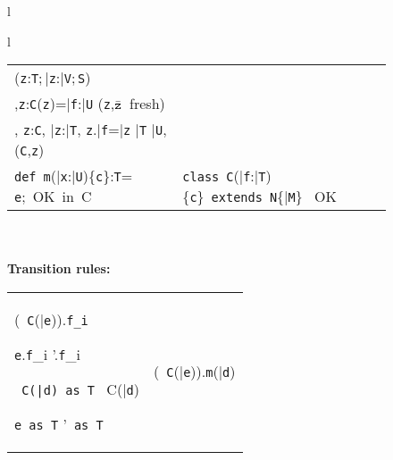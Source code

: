 \begin{figure*}
\begin{tabular}{l}
{\begin{tabular}{l}
\begin{tabular}{p{}p{}}
{                ({\tt z}:{\tt T};\,\bar{\tt z}:\bar{\tt V};\,{\tt S})}
	&
\infrule[T-New]
	{\Gamma \vdash \bar{\tt e}:\bar{\tt T} \andalso \vdash \klass({\tt C}) \\ 
	  \Gamma,{\tt z}:{\tt C}\vdash \fields({\tt z})=\bar{\tt f}:\bar{\tt U}  \andalso \mbox{({\tt z},$\bar{\tt z}$\ fresh)}\\
	  \Gamma, {\tt z}:{\tt C}, \bar{\tt z}:\bar{\tt T}, {\tt z}.\bar{\tt f}=\bar{\tt z} 
	  \vdash \bar{\tt T} \subtype \bar{\tt U}, \inv({\tt C},{\tt z})}
	{\Gamma \vdash \new\ {\tt C}(\bar{\tt e}): {\tt C}\{\bar{\tt z}:\bar{\tt T};\,\new\ {\tt C}(\bar{\tt z})=\self, \inv({\tt C},\self)\}}
\\[-12pt]
\infrule[Method OK]
	{\this:{\tt C}\vdash {\tt c}:o \andalso \this:{\tt C},\bar{\tt x}:\bar{\tt U},{\tt c} \vdash {\tt T} \ \type, \bar{\tt U} \ \type, 
	  {\tt e}:{\tt S}, {\tt S} \subtype {\tt T}}
	{{\tt def}\ {\tt m}(\bar{\tt x}:\bar{\tt U})\{{\tt c}\}:{\tt T}= {\tt e};\ \mbox{OK in}\ C}
	&
\infrule[Class OK]
	{\bar{\tt M}\ \mbox{OK in}\ {\tt C}
        \andalso
        \this:{\tt C} \vdash {\tt c}:{\tt o}
        \andalso
        \this:{\tt C},{\tt c} \vdash \bar{\tt T}\ \type, {\tt N}\ \type}
	{\mbox{\tt class}\ {\tt C}(\bar{\tt f}:\bar{\tt T})\{{\tt c}\}\ 
	  \mbox{\tt extends}\ {\tt N}\{\bar{\tt M}\} \ \mbox{OK}}
\end{tabular}
\end{tabular}}\\[-12pt]
\quad\\
{\bf Transition rules:}\\[-12pt]
{\tabcolsep=0pt
\begin{tabular}{p{}@{\quad}p{}}
\typicallabel{RC-Field}
\infrule[\RField]
	{\tt x:C \vdash \fields(\tt x)=\bar{\tt f}:\bar{\tt T}}
	{(\new\ {\tt C}(\bar{\tt e})).{\tt f_i} \derives {\tt e_i}}

\infrule[\RCField]%
	{{\tt e} \derives {{\tt e}}'}
	{{\tt e}.{\tt f}_i \derives {{\tt e}}'.{\tt f}_i}

\infrule[\RCast]%
	{\vdash {\tt C}\{\self==\new\ {\tt C}(\bar{\tt d})\} \subtype {\tt T}}
	{{\tt \new\ C(\bar{\tt d})~as~T} \derives \new\ C(\bar{\tt d})}

\infrule[\RCCast]%
	{{\tt e} \derives {{\tt e}}'}
	{{\tt e~as~T} \derives {\tt e}'~{\tt as~T}}
	&
	\typicallabel{RC-Invk-Recv}
	\infrule[\RInvk]
		{{\tt x:C}\vdash {\tt x}\ \has\ {\tt m}(\bar{\tt x}:\bar{\tt T}){\tt \{c\}:T=e}}
		{(\new\ {\tt C}(\bar{\tt e})).{\tt m}(\bar{\tt d}) \derives {\tt e[\new\ {\tt C}(\bar{\tt e}),\bar{\tt d}/\this,\bar{\tt x}]}}


\end{tabular}}
\end{tabular}
\end{figure*}
